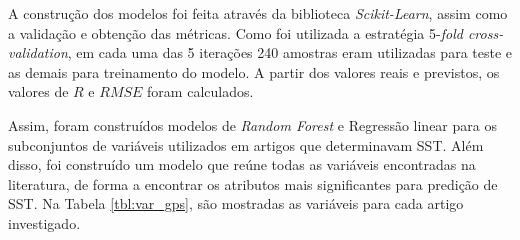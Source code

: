 A construção dos modelos foi feita através da biblioteca \textit{Scikit-Learn}, assim como a validação e obtenção das métricas. Como foi utilizada a estratégia 5-\textit{fold cross-validation}, em cada uma das 5 iterações 240 amostras eram utilizadas para teste e as demais para treinamento do modelo. A partir dos valores reais e previstos, os valores de $R$ e $RMSE$ foram calculados.

Assim, foram construídos modelos de \textit{Random Forest} e Regressão linear para os subconjuntos de variáveis utilizados em artigos que determinavam SST. Além disso, foi construído um modelo que reúne todas as variáveis encontradas na literatura, de forma a encontrar os atributos mais significantes para predição de SST. Na Tabela \ref{tbl:var_gps}, são mostradas as variáveis para cada artigo investigado.

